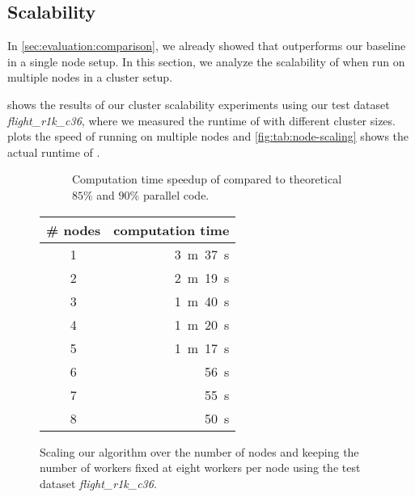 \subsection{Scalability}\label{sec:evaluation:scalability}

  In \cref{sec:evaluation:comparison}, we already showed that \dodo{} outperforms our baseline \ocddiscover{} in a single node setup.
  In this section, we analyze the scalability of \dodo{} when run on multiple nodes in a cluster setup.

   shows the results of our cluster scalability experiments using our test dataset \textit{flight\_r1k\_c36}, where we measured the runtime of \dodo{} with different cluster sizes.
   plots the speed of running \dodo{} on multiple nodes and \cref{fig:tab:node-scaling} shows the actual runtime of \dodo{}.

  \begin{figure}[htbp]
    \centering
    \begin{subfigure}[c]{0.6\textwidth}
      \centering
      
      \caption{Computation time speedup of \dodo{} compared to theoretical $85 \%$ and $90 \%$ parallel code.}
      \label{fig:fig:node-scaling}
    \end{subfigure}
    \begin{subtable}[c]{0.39\textwidth}
      \centering
      \begin{tabular}{cr}
        \toprule
        \textbf{\# nodes} & \textbf{computation time} \\
        \midrule
        1 & 3~m~37~s \\
        2 & 2~m~19~s \\
        3 & 1~m~40~s \\
        4 & 1~m~20~s \\
        5 & 1~m~17~s \\
        6 & 56~s \\
        7 & 55~s \\
        8 & 50~s \\
        \bottomrule
      \end{tabular}
      \caption{Computation time for finding all \glspl{od} in the dataset of different cluster sizes.}
      \label{fig:tab:node-scaling}
    \end{subtable}
    \caption{Scaling our algorithm over the number of nodes and keeping the number of workers fixed at eight workers per node using the test dataset \textit{flight\_r1k\_c36}.}
    \label{fig:node-scaling}
  \end{figure}

